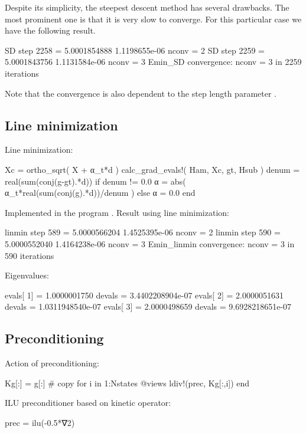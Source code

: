 Despite its simplicity, the steepest descent method has several drawbacks.
The most prominent one is that it is very slow to converge. For this particular case
we have the following result.

\begin{textcode}
SD step     2258 =       5.0001854888   1.1198655e-06  nconv =     2
SD step     2259 =       5.0001843756   1.1131584e-06  nconv =     3
Emin_SD convergence: nconv =     3 in  2259 iterations
\end{textcode}

Note that the convergence is also dependent to the step
length parameter .

\subsection{Line minimization}

Line minimization:
\begin{juliacode}
Xc = ortho_sqrt( X + α_t*d )
calc_grad_evals!( Ham, Xc, gt, Hsub )
denum = real(sum(conj(g-gt).*d))
if denum != 0.0
    α = abs( α_t*real(sum(conj(g).*d))/denum )
else
    α = 0.0
end
\end{juliacode}

Implemented in the program .
Result using line minimization:
\begin{textcode}
linmin step      589 =       5.0000566204   1.4525395e-06  nconv =     2
linmin step      590 =       5.0000552040   1.4164238e-06  nconv =     3
Emin_linmin convergence: nconv =     3 in   590 iterations
  
Eigenvalues:
  
evals[  1] =       1.0000001750 devals =   3.4402208904e-07
evals[  2] =       2.0000051631 devals =   1.0311948540e-07
evals[  3] =       2.0000498659 devals =   9.6928218651e-07  
\end{textcode}


\subsection{Preconditioning}

Action of preconditioning:

\begin{juliacode}
Kg[:] = g[:] # copy
for i in 1:Nstates
    @views ldiv!(prec, Kg[:,i])
end
\end{juliacode}

ILU preconditioner based on kinetic operator:
\begin{juliacode}
prec = ilu(-0.5*∇2)
\end{juliacode}

